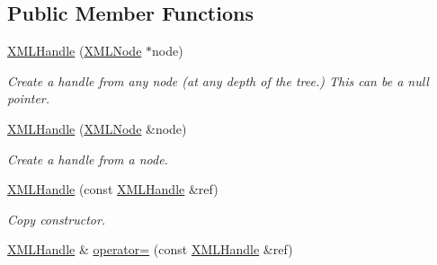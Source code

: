 \subsection*{Public Member Functions}
\begin{DoxyCompactItemize}
\item 
\hypertarget{classtinyxml2_1_1_x_m_l_handle_a9c240a35c18f053509b4b97ddccd9793}{}\hyperlink{classtinyxml2_1_1_x_m_l_handle_a9c240a35c18f053509b4b97ddccd9793}{X\+M\+L\+Handle} (\hyperlink{classtinyxml2_1_1_x_m_l_node}{X\+M\+L\+Node} $\ast$node)\label{classtinyxml2_1_1_x_m_l_handle_a9c240a35c18f053509b4b97ddccd9793}

\begin{DoxyCompactList}\small\item\em Create a handle from any node (at any depth of the tree.) This can be a null pointer. \end{DoxyCompactList}\item 
\hypertarget{classtinyxml2_1_1_x_m_l_handle_aa2edbc1c0d3e3e8259bd98de7f1cf500}{}\hyperlink{classtinyxml2_1_1_x_m_l_handle_aa2edbc1c0d3e3e8259bd98de7f1cf500}{X\+M\+L\+Handle} (\hyperlink{classtinyxml2_1_1_x_m_l_node}{X\+M\+L\+Node} \&node)\label{classtinyxml2_1_1_x_m_l_handle_aa2edbc1c0d3e3e8259bd98de7f1cf500}

\begin{DoxyCompactList}\small\item\em Create a handle from a node. \end{DoxyCompactList}\item 
\hypertarget{classtinyxml2_1_1_x_m_l_handle_afd8e01e6018c07347b8e6d80272466aa}{}\hyperlink{classtinyxml2_1_1_x_m_l_handle_afd8e01e6018c07347b8e6d80272466aa}{X\+M\+L\+Handle} (const \hyperlink{classtinyxml2_1_1_x_m_l_handle}{X\+M\+L\+Handle} \&ref)\label{classtinyxml2_1_1_x_m_l_handle_afd8e01e6018c07347b8e6d80272466aa}

\begin{DoxyCompactList}\small\item\em Copy constructor. \end{DoxyCompactList}\item 
\hypertarget{classtinyxml2_1_1_x_m_l_handle_a75b908322bb4b83be3281b6845252b20}{}\hyperlink{classtinyxml2_1_1_x_m_l_handle}{X\+M\+L\+Handle} \& \hyperlink{classtinyxml2_1_1_x_m_l_handle_a75b908322bb4b83be3281b6845252b20}{operator=} (const \hyperlink{classtinyxml2_1_1_x_m_l_handle}{X\+M\+L\+Handle} \&ref)\label{classtinyxml2_1_1_x_m_l_handle_a75b908322bb4b83be3281b6845252b20}


\end{DoxyCompactItemize}

